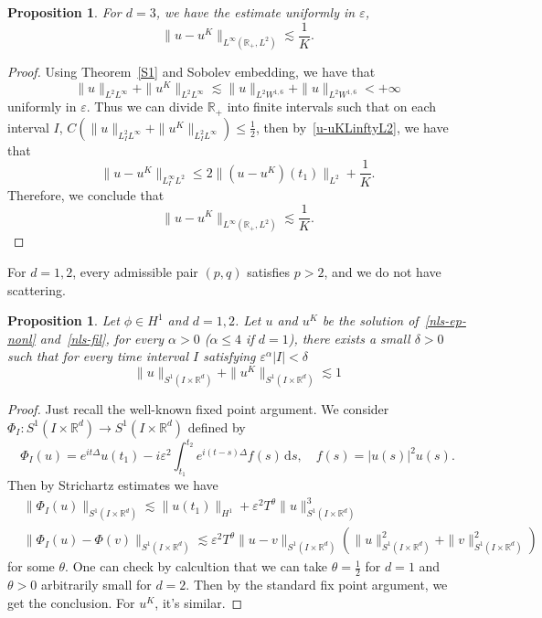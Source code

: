 \documentclass[10pt,a4paper]{article}
\newtheorem{proposition}[theorem]{Proposition}
\begin{document}
  \begin{proposition}
    For \(d=3\), we have the estimate uniformly in \(\varepsilon\),
    \begin{equation}
      \|u-u^K\|_{L^\infty({\mathbb R_+},L^2)} \lesssim \frac1K.
    \end{equation}
  \end{proposition}

  \begin{proof}
    Using Theorem~\ref{S1} and Sobolev embedding, we have that 
    \[ \|u\|_{L^2L^\infty}+\|u^K\|_{L^2L^\infty} \lesssim \|u\|_{L^2W^{1,6}} +
    \|u\|_{L^2W^{1,6}} < +\infty \]
    uniformly in \(\varepsilon\). Thus we can divide \(\mathbb R_+\) into finite 
    intervals such that on each interval \(I\), \(C (\|u\|_{L^2_I L^\infty} + 
    \|u^K\|_{L^2_I L^\infty}) \leq \frac12\), then by~\eqref{u-uKLinftyL2}, we
    have that 
    \[ \|u-u^K\|_{L^\infty_I L^2} \leq 2\|(u-u^K)(t_1)\|_{L^2} + \frac1K. \]
    Therefore, we conclude that 
    \[ \|u-u^K\|_{L^\infty({\mathbb R_+},L^2)} \lesssim \frac1K. \]
  \end{proof}

  For \(d=1,2\), every admissible pair \((p,q)\) satisfies \(p>2\), and we do not
  have scattering. 

  \begin{proposition}
    Let \(\phi\in H^1\) and \(d=1,2\). Let \(u\) and \(u^K\) be the solution 
    of~\eqref{nls-ep-nonl} and~\eqref{nls-fil}, for every \(\alpha>0\) (\(\alpha
    \leq 4\) if \(d=1\)), there exists a small \(\delta > 0\) such that for every
    time interval \(I\) satisfying \(\varepsilon^\alpha|I|<\delta\)
    \[ \|u\|_{S^1(I\times\mathbb R^d)} + \|u^K\|_{S^1(I\times\mathbb R^d)} \lesssim 1 \]
  \end{proposition}

  \begin{proof}
    Just recall the well-known fixed point argument. We consider 
    \(\Phi_I: S^1(I\times\mathbb R^d) \to S^1(I\times\mathbb R^d)\) 
    defined by
    \[ \Phi_I(u) = e^{it\Delta} u(t_1) - i\varepsilon^2 \int_{t_1}^{t_2} e^{i(t-s)\Delta}
    f(s)\,\mathrm{d}s, \quad f(s)=|u(s)|^2u(s). \]
    Then by Strichartz estimates we have
    \begin{equation}
      \begin{aligned}
        & \|\Phi_I(u)\|_{S^1(I\times\mathbb R^d)} \lesssim \|u(t_1)\|_{H^1} + \varepsilon^2
        T^\theta \|u\|_{S^1(I\times\mathbb R^d)}^3 \\
        & \|\Phi_I(u)-\Phi(v)\|_{S^1(I\times\mathbb R^d)} \lesssim \varepsilon^2
        T^\theta \|u-v\|_{S^1(I\times\mathbb R^d)} (\|u\|_{S^1(I\times\mathbb R^d)}^2 + \|v\|_{S^1(I\times\mathbb R^d)}^2) 
      \end{aligned}
    \end{equation}
    for some \(\theta\). One can check by calcultion that we can take
    \(\theta=\frac12\) for \(d=1\) and \(\theta>0\) arbitrarily small for \(d=2\).
    Then by the standard fix point argument, we get the conclusion. For \(u^K\),
    it's similar.
  \end{proof}
\end{document}
